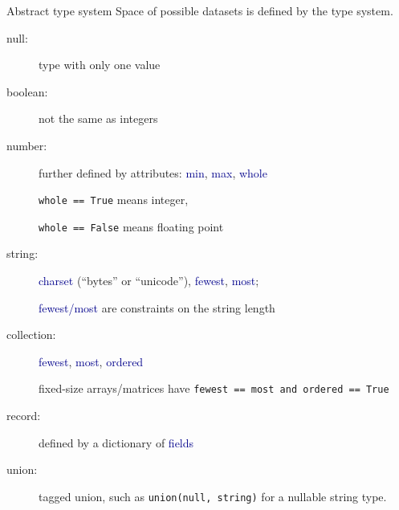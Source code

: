 \documentclass{beamer}
\begin{document}
\begin{frame}{Abstract type system}
\vspace{0.5 cm}
Space of possible datasets is defined by the type system.

\begin{description}
\item[null:] type with only one value
\item[boolean:] not the same as integers
\item[number:] further defined by attributes: \textcolor{darkblue}{min}, \textcolor{darkblue}{max}, \textcolor{darkblue}{whole}

{\tt whole == True} means integer,

{\tt whole == False} means floating point

\item[string:] \textcolor{darkblue}{charset} (``bytes'' or ``unicode''), \textcolor{darkblue}{fewest}, \textcolor{darkblue}{most};

\textcolor{darkblue}{fewest/most} are constraints on the string length

\item[collection:] \textcolor{darkblue}{fewest}, \textcolor{darkblue}{most}, \textcolor{darkblue}{ordered}

fixed-size arrays/matrices have {\tt fewest == most and ordered == True}

\item[record:] defined by a dictionary of \textcolor{darkblue}{fields}
\item[union:] tagged union, such as {\tt union(null, string)} for a nullable string type.
\end{description}
\end{frame}
\end{document}
